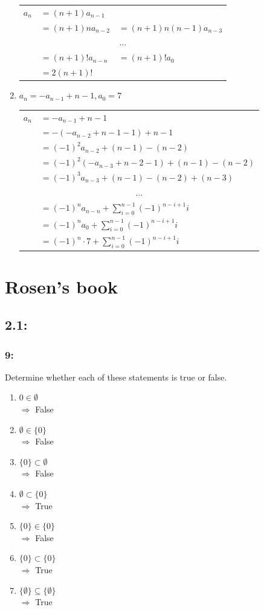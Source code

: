 \documentclass[12pt,en,a4paper]{article}
\begin{document}
\begin{enumerate}
\begin{tabular}{l l l}
			$a_n$ & $=(n+1)a_{n-1}$ & {}\\
			{} & $=(n+1)na_{n-2}$ & $=(n+1)n(n-1)a_{n-3}$\\
			\multicolumn{3}{c}{...}\\
			{} & $=(n+1)!a_{n-n}$ & $=(n+1)!a_0$\\
			{} & $=2(n+1)!$ & {}
		\end{tabular}
	\newpage
		\item $a_n = -a_{n-1}+n-1, a_0 =7$\\
		\begin{tabular}{l l}
			$a_n$ & $=-a_{n-1}+n-1$\\
			{} & $=-(-a_{n-2}+n-1-1)+n-1$\\ {} & $=(-1)^2 a_{n-2}+(n-1)-(n-2)$\\
			{} & $=(-1)^2(-a_{n-3}+n-2-1)+(n-1)-(n-2)$\\ {} & $=(-1)^3a_{n-3}+(n-1)-(n-2)+(n-3)$\\
			\multicolumn{2}{c}{...}\\
			{} & $=(-1)^na_{n-n}+\sum_{i=0}^{n-1}(-1)^{n-i+1}i$\\
			{} & $=(-1)^na_0+\sum_{i=0}^{n-1}(-1)^{n-i+1}i$\\
			{} & $=(-1)^n\cdot7+\sum_{i=0}^{n-1}(-1)^{n-i+1}i$
		\end{tabular}
	\end{enumerate}
\newpage
{}
	\section*{Rosen's book}
	\subsection*{2.1:}
	\subsubsection*{9:}
	Determine whether each of these statements is true or false.
	\begin{enumerate}[label=\textbf{$\alph*$)}]
		\item $0\in\emptyset$\\
		$\Rightarrow$ False
		\item $\emptyset\in\{0\}$\\
		$\Rightarrow$ False
		\item $\{0\}\subset\emptyset$\\
		$\Rightarrow$ False
		\item $\emptyset\subset\{0\}$\\
		$\Rightarrow$ True
		\item $\{0\}\in\{0\}$\\
		$\Rightarrow$ False
		\item $\{0\}\subset\{0\}$\\
		$\Rightarrow$ True
		\item $\{\emptyset\}\subseteq\{\emptyset\}$\\
		$\Rightarrow$ True
	\end{enumerate}
\end{document}
